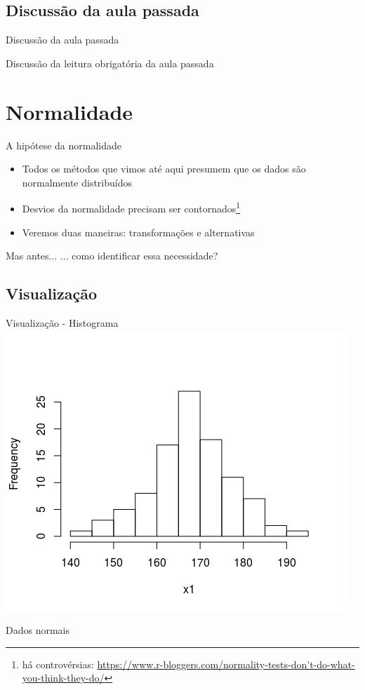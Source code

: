 \documentclass{beamer}
\begin{document}
\subsection{Discussão da aula passada}

\begin{frame}{Discussão da aula passada}
  \begin{block}{}
    Discussão da leitura obrigatória da aula passada
  \end{block}
\end{frame}

\section{Normalidade}

\begin{frame}{A hipótese da normalidade}
  \begin{itemize}
    \small
  \item Todos os métodos que vimos até aqui presumem que os dados são normalmente distribuídos
  \item Desvios da normalidade precisam ser contornados\footnote{há controvérsias: {\tiny  \url{https://www.r-bloggers.com/normality-tests-don't-do-what-you-think-they-do/}}}
    \bigskip
  \item Veremos duas maneiras: transformações e alternativas
  \end{itemize}
    \bigskip
  \begin{block}{Mas antes...}
    ... como identificar essa necessidade?
  \end{block}
\end{frame}

\subsection{Visualização}

\begin{frame}{Visualização - Histograma}
  \centering
  \includegraphics[width=.7\textwidth]{Cap37-38/normal1-h}

  Dados normais
\end{frame}
\end{document}
